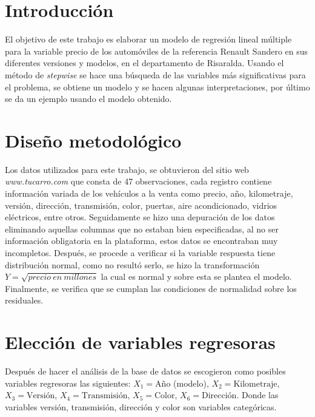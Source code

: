 \documentclass[12pt,a0,portrait]{a0poster}
\begin{document}
\begin{multicols}{2}


\section*{\textcolor{ginger}{\huge Introducci\'on}}
El objetivo de este trabajo es elaborar un modelo de regresi\'on lineal m\'ultiple para la variable precio de los autom\'oviles de la referencia Renault Sandero en sus diferentes versiones y modelos, en el departamento de Risaralda. Usando el m\'etodo de \textit{stepwise} se hace una b\'usqueda de las variables m\'as significativas para el problema, se obtiene un modelo y se hacen algunas interpretaciones, por \'ultimo se da un ejemplo usando el modelo obtenido.

\section*{\textcolor{ginger}{\huge Dise\~no metodol\'ogico}}

Los datos utilizados para este trabajo, se obtuvieron del sitio web \textit{www.tucarro.com} que consta de 47 observaciones, cada registro contiene informaci\'on variada de los veh\'iculos a la venta como precio, a\~no, kilometraje, versi\'on, direcci\'on, transmisi\'on, color, puertas, aire acondicionado, vidrios el\'ectricos, entre otros. Seguidamente se hizo una depuraci\'on de los datos eliminando aquellas columnas que no estaban bien especificadas, al no ser informaci\'on obligatoria en la plataforma, estos datos se encontraban muy incompletos. Despu\'es, se procede a verificar si la variable respuesta tiene distribuci\'on normal, como no result\'o serlo, se hizo la transformaci\'on $Y=\sqrt{precio\ en\ millones}$ la cual es normal y sobre esta se plantea el modelo. Finalmente, se verifica que se cumplan las condiciones de normalidad sobre los residuales.

\section*{\textcolor{ginger}{\huge Elecci\'on de variables regresoras}}

Despu\'es de hacer el an\'alisis de la base de datos se escogieron como posibles variables regresoras las siguientes: $X_1= \text{A\~no}$ (modelo), $X_2=\text{Kilometraje}$, $X_3= \text{Versi\'on}$, $X_4=\text{Transmisi\'on}$, $X_5=\text{Color}$, $X_6=\text{Direcci\'on}$. Donde las variables versi\'on, transmisi\'on, direcci\'on y color son variables categ\'oricas.


\end{multicols}
\end{document}
